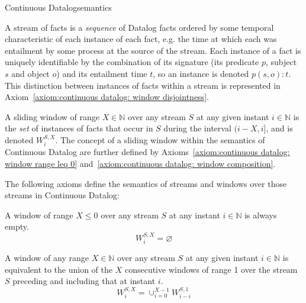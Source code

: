 \begin{nestedsection}{Continuous Datalog}{semantics}
\begin{definition}
\label{def:continuous datalog: stream}
A stream of facts is a \emph{sequence} of Datalog facts ordered by
some temporal characteristic of each instance of each fact, e.g. the
time at which each was entailment by some process at the source of the
stream.  Each instance of a fact is uniquely identifiable by the
combination of its signature (its predicate $p$, subject $s$ and
object $o$) and its entailment time $t$, so an instance is denoted
${p(s,o):t}$.  This distinction between instances of facts within a
stream is represented in Axiom~\ref{axiom:continuous datalog: window
  disjointness}.
\end{definition}

\begin{definition}
\label{def:continuous datalog: window}
A sliding window of range ${X \in \mathbb{N}}$ over any stream $S$ at
any given instant ${i \in \mathbb{N}}$ is the \emph{set} of instances
of facts that occur in $S$ during the interval ${(i-X,i]}$, and is
denoted ${W^{S,X}_{i}}$.  The concept of a sliding window within the
semantics of Continuous Datalog are further defined by
Axioms~\ref{axiom:continuous datalog: window range leq 0}
and~\ref{axiom:continuous datalog: window composition}.
\end{definition}

The following axioms define the semantics of streams and windows over
those streams in Continuous Datalog:

\begin{axiom}
\label{axiom:continuous datalog: window range leq 0}
A window of range ${X \leq 0}$ over any stream $S$ at any instant ${i
  \in \mathbb{N}}$ is always empty.
\begin{equation*}
W^{S,X}_{i} = \varnothing
\end{equation*}
\end{axiom}

\begin{axiom}
\label{axiom:continuous datalog: window composition}
A window of any range ${X \in \mathbb{N}}$ over any stream $S$ at any
given instant ${i \in \mathbb{N}}$ is equivalent to the union of the
$X$ consecutive windows of range 1 over the stream $S$ preceding and
including that at instant $i$.
\begin{equation*}
W^{S,X}_{i} = \mathop{\cup}_{i=0}^{X-1} W^{S,1}_{i-i}
\end{equation*}
\end{axiom}


\end{nestedsection}
